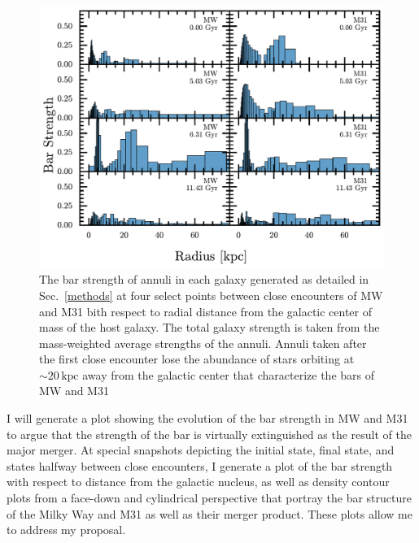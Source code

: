 \documentclass[twocolumn]{aastex631}
\DeclareRobustCommand{\Secref}[1]{Sec.~\ref{#1}}
\begin{document}
\begin{figure}[htbp]
  \centering
  \includegraphics[width=1.0\textwidth]{bar_histogram}
  \caption{The bar strength of annuli in each galaxy generated as
    detailed in \Secref{methods} at four select points between close
    encounters of MW and M31 bith respect to radial distance from the
    galactic center of mass of the host galaxy. The total galaxy
    strength is taken from the mass-weighted average strengths of the
    annuli. Annuli taken after the first close encounter lose the
    abundance of stars orbiting at $\sim 20\,\mathrm{kpc}$ away from the
    galactic center that characterize the bars of MW and M31}
  \label{fig:annuli}
\end{figure}

I will generate a plot showing the evolution of the bar strength in MW
and M31 to argue that the strength of the bar is virtually
extinguished as the result of the major merger. At special snapshots
depicting the initial state, final state, and states halfway between
close encounters, I generate a plot of the bar strength with respect
to distance from the galactic nucleus, as well as density contour
plots from a face-down and cylindrical perspective that portray the
bar structure of the Milky Way and M31 as well as their merger
product. These plots allow me to address my proposal.
\end{document}
